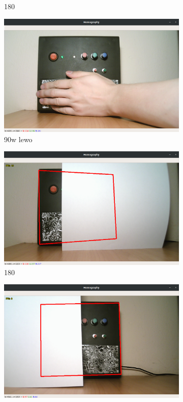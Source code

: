 \documentclass[12pt,twoside,polish]{article}
\begin{document}
\begin{figure}[htb!]
\begin{subfigure}[b]{0.5\textwidth}
		\caption{180\degree}
		\label{test_cover2}
	\end{subfigure}
	\begin{subfigure}[b]{0.5\textwidth}
		\includegraphics[width=\textwidth]{test_cover3}
		\caption{90\degree w lewo}
		\label{test_cover3}
	\end{subfigure}
	\begin{subfigure}[b]{0.5\textwidth}
		\includegraphics[width=\textwidth]{test_cover4}
		\caption{180\degree}
		\label{test_cover4}
	\end{subfigure}
	\begin{subfigure}[b]{0.5\textwidth}
		\includegraphics[width=\textwidth]{test_cover5}

\end{subfigure}
\end{figure}
\end{document}
